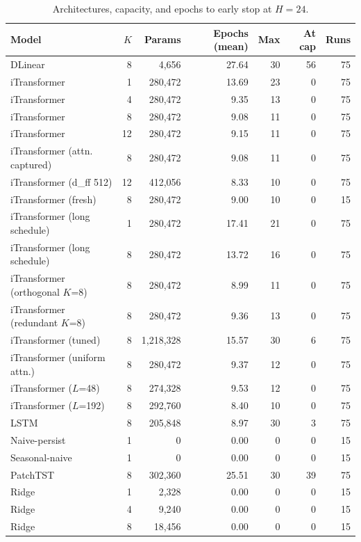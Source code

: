 \begin{table}[!t]
\centering
\caption{Architectures, capacity, and epochs to early stop at $H=24$.}
\label{tab:hyperparameters}
\begin{tabular}{lrrrrrr}
\toprule
Model & $K$ & Params & Epochs (mean) & Max & At cap & Runs \\
\midrule
DLinear & 8 & 4,656 & 27.64 & 30 & 56 & 75 \\
iTransformer & 1 & 280,472 & 13.69 & 23 & 0 & 75 \\
iTransformer & 4 & 280,472 & 9.35 & 13 & 0 & 75 \\
iTransformer & 8 & 280,472 & 9.08 & 11 & 0 & 75 \\
iTransformer & 12 & 280,472 & 9.15 & 11 & 0 & 75 \\
iTransformer (attn. captured) & 8 & 280,472 & 9.08 & 11 & 0 & 75 \\
iTransformer (d\_ff 512) & 12 & 412,056 & 8.33 & 10 & 0 & 75 \\
iTransformer (fresh) & 8 & 280,472 & 9.00 & 10 & 0 & 15 \\
iTransformer (long schedule) & 1 & 280,472 & 17.41 & 21 & 0 & 75 \\
iTransformer (long schedule) & 8 & 280,472 & 13.72 & 16 & 0 & 75 \\
iTransformer (orthogonal $K$=8) & 8 & 280,472 & 8.99 & 11 & 0 & 75 \\
iTransformer (redundant $K$=8) & 8 & 280,472 & 9.36 & 13 & 0 & 75 \\
iTransformer (tuned) & 8 & 1,218,328 & 15.57 & 30 & 6 & 75 \\
iTransformer (uniform attn.) & 8 & 280,472 & 9.37 & 12 & 0 & 75 \\
iTransformer ($L$=48) & 8 & 274,328 & 9.53 & 12 & 0 & 75 \\
iTransformer ($L$=192) & 8 & 292,760 & 8.40 & 10 & 0 & 75 \\
LSTM & 8 & 205,848 & 8.97 & 30 & 3 & 75 \\
Naive-persist & 1 & 0 & 0.00 & 0 & 0 & 15 \\
Seasonal-naive & 1 & 0 & 0.00 & 0 & 0 & 15 \\
PatchTST & 8 & 302,360 & 25.51 & 30 & 39 & 75 \\
Ridge & 1 & 2,328 & 0.00 & 0 & 0 & 15 \\
Ridge & 4 & 9,240 & 0.00 & 0 & 0 & 15 \\
Ridge & 8 & 18,456 & 0.00 & 0 & 0 & 15 \\

\end{tabular}
\end{table}
